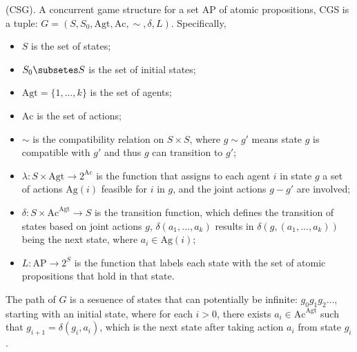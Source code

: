 \begin{definition}(CSG). A concurrent game structure for a set \( \text{AP} \) of atomic propositions, CGS is a tuple: \( G = (S, S_0, \text{Agt}, \text{Ac}, \sim, \delta, L) \). Specifically,

\begin{itemize}
    \item \( S \) is the set of states;
    \item \( S_0 \subsetes S \) is the set of initial states;
    \item \( \text{Agt} = \{1,...,k\} \) is the set of agents;
    \item \( \text{Ac} \) is the set of actions;
    \item \( \sim \) is the compatibility relation on \( S \times S \), where \( g \sim g' \) means state \( g \) is compatible with \( g' \) and thus \( g \) can transition to \( g' \);
    \item \( \lambda: S \times \text{Agt} \rightarrow 2^{\text{Ac}} \) is the function that assigns to each agent \( i \) in state \( g \) a set of actions \( \text{Ag}(i) \) feasible for \( i \) in \( g \), and the joint actions \( g - g' \) are involved;
    \item \( \delta: S \times \text{Ac}^{\text{Agt}} \rightarrow S \) is the transition function, which defines the transition of states based on joint actions \( g \), \( \delta(a_1,...,a_k) \) results in \( \delta(g,(a_1,...,a_k)) \) being the next state, where \( a_i \in \text{Ag}(i) \);
    \item \( L: \text{AP} \rightarrow 2^S \) is the function that labels each state with the set of atomic propositions that hold in that state.
\end{itemize}

The path of \( G \) is a sesuence of states that can potentially be infinite: \( g_0g_1g_2... \), starting with an initial state, where for each \( i > 0 \), there exists \( a_i \in \text{Ac}^{\text{Agt}} \) such that \( g_{i+1} = \delta(g_i,a_i) \), which is the next state after taking action \( a_i \) from state \( g_i \).
  
\end{definition} 
